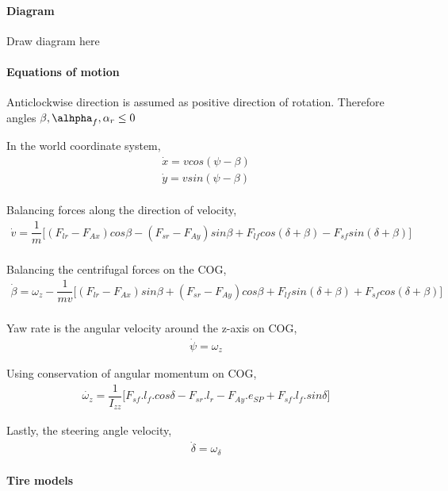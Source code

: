 \documentclass{article}
\begin{document}
\paragraph{Diagram}
Draw diagram here

\paragraph{Equations of motion}

Anticlockwise direction is assumed as positive direction of rotation. Therefore angles \(\beta, \alhpha_f, \alpha_r \leq 0 \)

In the world coordinate system, 
\begin{align}
    \dot{x} = v cos(\psi - \beta) \\
    \dot{y} = v sin(\psi - \beta)
\end{align}
\\

Balancing forces along the direction of velocity,
\begin{align}
    \dot{v} = \dfrac{1}{m} \bigg[ (F_{lr} - F_{Ax})cos\beta - (F_{sr} - F_{Ay})sin\beta + F_{lf}cos(\delta + \beta) - F_{sf}sin(\delta + \beta)
    \bigg]
\end{align}
\\

Balancing the centrifugal forces on the COG,
\begin{align}
    \dot{\beta} = \omega_z - \dfrac{1}{mv}\bigg[ (F_{lr} - F_{Ax})sin\beta + (F_{sr} - F_{Ay})cos\beta + F_{lf}sin(\delta + \beta) + F_{sf}cos(\delta + \beta)
    \bigg]
\end{align}
\\

Yaw rate is the angular velocity around the z-axis on COG,
\begin{align}
    \dot{\psi} = \omega_z
\end{align}

Using conservation of angular momentum on COG,
\begin{align}
    \dot{\omega_z} = \dfrac{1}{I_{zz}}\bigg[ F_{sf}.l_f.cos\delta - F_{sr}.l_r - F_{Ay}.e_{SP} + F_{sf}.l_f.sin\delta \bigg]
\end{align}

Lastly, the steering angle velocity,
\begin{align}
    \dot{\delta} = \omega_{\delta}
\end{align}

\paragraph{Tire models}
\end{document}
